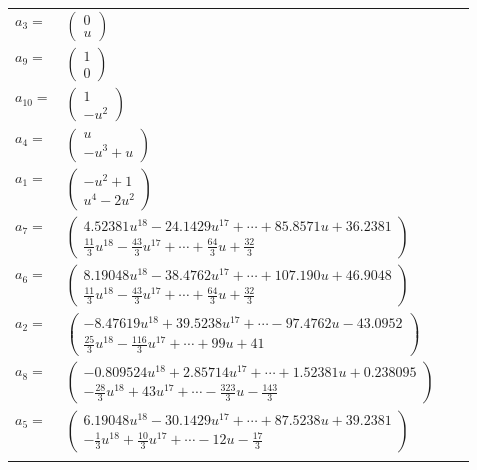 \documentclass[1p]{elsarticle_modified}
\theoremstyle{definition}
\begin{document}
\begin{tabular}{m{7pt} m{180pt} m{7pt} m{180pt} }
\flushright $a_{3}=$&$\begin{pmatrix}0\\u\end{pmatrix}$ \\
\flushright $a_{9}=$&$\begin{pmatrix}1\\0\end{pmatrix}$ \\
\flushright $a_{10}=$&$\begin{pmatrix}1\\- u^2\end{pmatrix}$ \\
\flushright $a_{4}=$&$\begin{pmatrix}u\\- u^3+u\end{pmatrix}$ \\
\flushright $a_{1}=$&$\begin{pmatrix}- u^2+1\\u^4-2 u^2\end{pmatrix}$ \\
\flushright $a_{7}=$&$\begin{pmatrix}4.52381 u^{18}-24.1429 u^{17}+\cdots+85.8571 u+36.2381\\\frac{11}{3} u^{18}-\frac{43}{3} u^{17}+\cdots+\frac{64}{3} u+\frac{32}{3}\end{pmatrix}$ \\
\flushright $a_{6}=$&$\begin{pmatrix}8.19048 u^{18}-38.4762 u^{17}+\cdots+107.190 u+46.9048\\\frac{11}{3} u^{18}-\frac{43}{3} u^{17}+\cdots+\frac{64}{3} u+\frac{32}{3}\end{pmatrix}$ \\
\flushright $a_{2}=$&$\begin{pmatrix}-8.47619 u^{18}+39.5238 u^{17}+\cdots-97.4762 u-43.0952\\\frac{25}{3} u^{18}-\frac{116}{3} u^{17}+\cdots+99 u+41\end{pmatrix}$ \\
\flushright $a_{8}=$&$\begin{pmatrix}-0.809524 u^{18}+2.85714 u^{17}+\cdots+1.52381 u+0.238095\\-\frac{28}{3} u^{18}+43 u^{17}+\cdots-\frac{323}{3} u-\frac{143}{3}\end{pmatrix}$ \\
\flushright $a_{5}=$&$\begin{pmatrix}6.19048 u^{18}-30.1429 u^{17}+\cdots+87.5238 u+39.2381\\-\frac{1}{3} u^{18}+\frac{10}{3} u^{17}+\cdots-12 u-\frac{17}{3}\end{pmatrix}$\\&\end{tabular}
\end{document}
